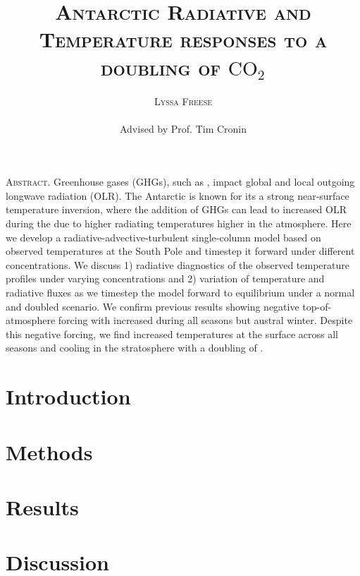 \documentclass[12]{article}
\title{{\textsc{\Large Antarctic Radiative and Temperature responses to a doubling of $\text{CO}_2$}}}
\author{\textsc{Lyssa Freese}
\\\\
Advised by Prof. Tim Cronin}
\begin{document}
\maketitle
\thispagestyle{empty}

\setlength{\leftskip}{1.1cm}
\setlength{\rightskip}{1.1cm}


\bigskip
\bigskip

{\textsc{Abstract.} }Greenhouse gases (GHGs), such as , impact global and local outgoing longwave radiation (OLR). The Antarctic is known for its a strong near-surface temperature inversion, where the addition of GHGs can lead to increased OLR during the due to higher radiating temperatures higher in the atmosphere.  Here we develop a radiative-advective-turbulent single-column model based on observed temperatures at the South Pole and timestep it forward under different  concentrations. We discuss 1) radiative diagnostics of the observed temperature profiles under varying  concentrations and 2) variation of temperature and radiative fluxes as we timestep the model forward to equilibrium under a normal and doubled  scenario. We confirm previous results showing negative top-of-atmosphere forcing with increased  during all seasons but austral winter. Despite this negative forcing, we find increased temperatures at the surface across all seasons and cooling in the stratosphere with a doubling of .

\section{Introduction}
\section{Methods}
\section{Results}
\section{Discussion}



\end{document}
